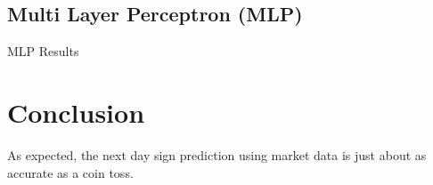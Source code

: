 \documentclass{article}\raggedbottom
\begin{document}
\subsection{Multi Layer Perceptron (MLP)}

\begin{table}[h]
	\centering
	\caption{MLP Results}
	\label{tab:MLP}
\end{table}
\section{Conclusion}
As expected, the next day sign prediction using market data is just about as accurate as a coin toss.

 

\end{document}
